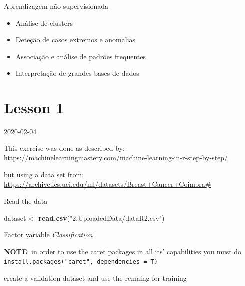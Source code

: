 \documentclass[]{book}
\newenvironment{Shaded}{\begin{snugshade}}{\end{snugshade}}
\newcommand{\KeywordTok}[1]{\textcolor[rgb]{0.13,0.29,0.53}{\textbf{#1}}}
\newcommand{\NormalTok}[1]{#1}
\newcommand{\OperatorTok}[1]{\textcolor[rgb]{0.81,0.36,0.00}{\textbf{#1}}}
\newcommand{\StringTok}[1]{\textcolor[rgb]{0.31,0.60,0.02}{#1}}
\providecommand{\tightlist}{%
  \setlength{\itemsep}{0pt}\setlength{\parskip}{0pt}}
\begin{document}
Aprendizagem não supervisionada

\begin{itemize}
\tightlist
\item
  Análise de clusters
\item
  Deteção de casos extremos e anomalias
\item
  Associação e análise de padrões frequentes
\item
  Interpretação de grandes bases de dados
\end{itemize}

\hypertarget{lesson-1-1}{%
\section{Lesson 1}\label{lesson-1-1}}

2020-02-04

This exercise was done as described by: \url{https://machinelearningmastery.com/machine-learning-in-r-step-by-step/}

but using a data set from:
\url{https://archive.ics.uci.edu/ml/datasets/Breast+Cancer+Coimbra\#}

Read the data

\begin{Shaded}
\begin{Highlighting}[]
\NormalTok{dataset <-}\StringTok{ }\KeywordTok{read.csv}\NormalTok{(}\StringTok{"2.UploadedData/dataR2.csv"}\NormalTok{)}
\end{Highlighting}
\end{Shaded}

Factor variable \emph{Classification}

\begin{Shaded}
\end{Shaded}

\textbf{NOTE}: in order to use the caret packages in all its' capabilities you must do \texttt{install.packages("caret",\ dependencies\ =\ T)}

create a validation dataset and use the remaing for training
\end{document}
